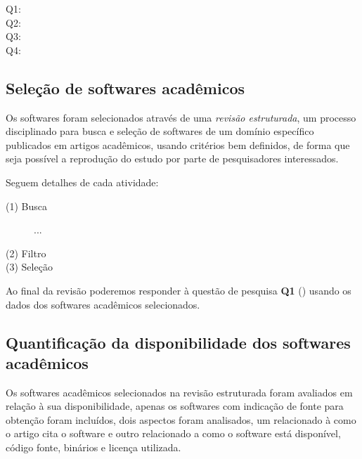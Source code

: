 \begin{description}
  \item [Q1:] \QuestaoUm
  \item [Q2:] \QuestaoDois
  \item [Q3:] \QuestaoTres
  \item [Q4:] \QuestaoQuatro
\end{description}

\subsection{Seleção de softwares acadêmicos}

Os softwares foram selecionados através de uma {\it revisão estruturada}, um processo disciplinado
para busca e seleção de softwares de um domínio específico publicados em
artigos acadêmicos, usando critérios bem definidos, de forma que seja
possível a reprodução do estudo por parte de pesquisadores interessados.


Seguem detalhes de cada atividade:

\begin{description}

  \item[(1) Busca] ...

  \item[(2) Filtro]

  \item[(3) Seleção]

\end{description}

Ao final da revisão poderemos responder à questão de pesquisa {\bf Q1}
(\QuestaoUm) usando os dados dos softwares acadêmicos selecionados.

\subsection{Quantificação da disponibilidade dos softwares acadêmicos}

Os softwares acadêmicos selecionados na revisão estruturada foram avaliados em
relação à sua disponibilidade, apenas os softwares com indicação de fonte para
obtenção foram incluídos, dois aspectos foram analisados, um relacionado à como
o artigo cita o software e outro relacionado a como o software está disponível,
código fonte, binários e licença utilizada.

